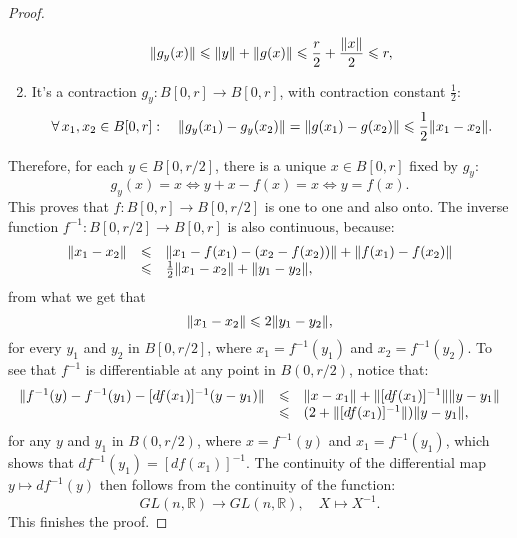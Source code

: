 \begin{proof}
\begin{enumerate}
\[			      \lVert g_{y}(x)\rVert
			      \leqslant
			      \lVert y\rVert+\lVert g(x)\rVert
			      \leqslant
			      \frac{r}{2}+\frac{\lVert x\rVert}{2}
			      \leqslant
			      r,
		      \]
		\item
		      It's a contraction \(g_{y}:{B[0,r]}\to{B[0,r]}\), with contraction
		      constant \(\frac{1}{2}\):
		      \[
			      \forall\,{x_{1},x_{2}}\in{B[0,r]}:\quad
			      \lVert g_{y}(x_{1})-g_{y}(x_{2})\rVert
			      =
			      \lVert g(x_{1})-g(x_{2})\rVert
			      \leqslant
			      \frac{1}{2}\lVert x_{1}-x_{2}\rVert.
		      \]
	\end{enumerate}
	Therefore, for each \({y}\in{B[0,r/2]}\), there is a unique
	\({x}\in{B[0,r]}\) fixed by \(g_{y}\):
	\[
		g_{y}(x)=x
		\iff
		y + x - f(x) = x
		\iff
		y = f(x).
	\]
	This proves that \(f:{B[0,r]}\to{B[0,r/2]}\) is one to one and also onto. The
	inverse function \(f^{-1}:{B[0,r/2]}\to{B[0,r]}\) is also continuous, because:
	\[
		\begin{array}{rcl}
			\lVert x_{1}-x_{2}\rVert
			 & \leqslant &
			\lVert x_{1}-f(x_{1}) - (x_{2}-f(x_{2}))\rVert
			+
			\lVert f(x_{1})-f(x_{2})\rVert
			\\
			 & \leqslant &
			\frac{1}{2}\lVert x_{1}-x_{2}\rVert
			+
			\lVert y_{1}-y_{2}\rVert,
		\end{array}
	\]
	from what we get that
	\[
		\lVert x_{1}-x_{2}\rVert\leqslant{2\lVert y_{1}-y_{2}\rVert},
	\]
	for every \(y_{1}\) and \(y_{2}\) in \(B[0,r/2]\), where
	\(x_{1}=f^{-1}(y_{1})\) and \(x_{2}=f^{-1}(y_{2})\). To see that \(f^{-1}\) is
	differentiable at any point in \(B(0,r/2)\), notice that:
	\[
		\begin{array}{rcl}
			\lVert f^{-1}(y)-f^{-1}(y_{1})-[df(x_{1})]^{-1}(y-y_{1})\rVert
			 & \leqslant &
			\lVert x-x_{1}\rVert
			+
			\lVert[df(x_{1})]^{-1}\rVert\lVert y-y_{1}\rVert
			\\
			 & \leqslant &
			(2+\lVert[df(x_{1})]^{-1}\rVert)\lVert y-y_{1}\rVert,
		\end{array}
	\]
	for any \(y\) and \(y_{1}\) in \(B(0,r/2)\), where \(x=f^{-1}(y)\) and
	\(x_{1}=f^{-1}(y_{1})\), which shows that \(df^{-1}(y_{1})=[df(x_{1})]^{-1}\).
	The continuity of the differential map \({y}\mapsto{df^{-1}(y)}\) then follows
	from the continuity of the function:
	\[
		{GL(n,\mathbb{R})}\to{GL(n,\mathbb{R})},\quad{{X}\mapsto{X^{-1}}}.
	\]
	This finishes the proof.
\end{proof}
